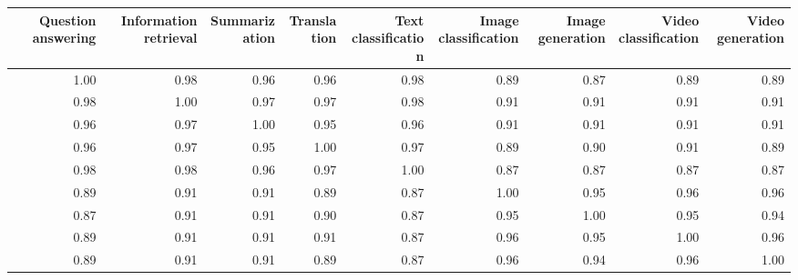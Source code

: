 \begin{tabular}{rrrrrrrrr}
\toprule
Question answering & Information retrieval & Summarization & Translation & Text classification & Image classification & Image generation & Video classification & Video generation \\
\midrule
1.00 & 0.98 & 0.96 & 0.96 & 0.98 & 0.89 & 0.87 & 0.89 & 0.89 \\
0.98 & 1.00 & 0.97 & 0.97 & 0.98 & 0.91 & 0.91 & 0.91 & 0.91 \\
0.96 & 0.97 & 1.00 & 0.95 & 0.96 & 0.91 & 0.91 & 0.91 & 0.91 \\
0.96 & 0.97 & 0.95 & 1.00 & 0.97 & 0.89 & 0.90 & 0.91 & 0.89 \\
0.98 & 0.98 & 0.96 & 0.97 & 1.00 & 0.87 & 0.87 & 0.87 & 0.87 \\
0.89 & 0.91 & 0.91 & 0.89 & 0.87 & 1.00 & 0.95 & 0.96 & 0.96 \\
0.87 & 0.91 & 0.91 & 0.90 & 0.87 & 0.95 & 1.00 & 0.95 & 0.94 \\
0.89 & 0.91 & 0.91 & 0.91 & 0.87 & 0.96 & 0.95 & 1.00 & 0.96 \\
0.89 & 0.91 & 0.91 & 0.89 & 0.87 & 0.96 & 0.94 & 0.96 & 1.00 \\
\bottomrule
\end{tabular}

